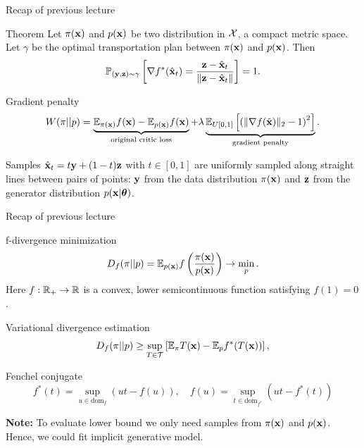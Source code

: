 \begin{frame}{Recap of previous lecture}
	\begin{block}{Theorem}
		Let $\pi(\mathbf{x})$ and $p(\mathbf{x})$ be two distribution in $\mathcal{X}$, a compact metric space. Let $\gamma$ be the optimal transportation plan between $\pi(\mathbf{x})$ and $p(\mathbf{x})$. Then
		\vspace{-0.4cm}
		\[
			\mathbb{P}_{(\mathbf{y}, \mathbf{z}) \sim \gamma} \left[ \nabla f^*(\hat{\mathbf{x}}_t) = \frac{\mathbf{z} - \hat{\mathbf{x}}_t}{\| \mathbf{z} - \hat{\mathbf{x}}_t \|} \right] = 1.
		\]
		\vspace{-0.6cm}
	\end{block}
	\begin{block}{Gradient penalty}
		\vspace{-0.5cm}
		\[
			W(\pi || p) = \underbrace{\mathbb{E}_{\pi(\mathbf{x})} f(\mathbf{x})  - \mathbb{E}_{p(\mathbf{x})} f(\mathbf{x})}_{\text{original critic loss}} + \lambda \underbrace{\mathbb{E}_{U[0, 1]} \left[ \left( \| \nabla f(\hat{\mathbf{x}}) \|_2 - 1 \right) ^ 2\right]}_{\text{gradient penalty}}.
		\]
		\vspace{-0.5cm}
	\end{block}
	Samples $\hat{\mathbf{x}}_t = t \mathbf{y} + (1 - t) \mathbf{z}$ with $t \in [0, 1]$ are uniformly sampled along straight lines between pairs of points: $\mathbf{y}$ from the data distribution $\pi(\mathbf{x})$ and $\mathbf{z}$ from the generator distribution $p(\mathbf{x} | \boldsymbol{\theta})$.
\end{frame}
\begin{frame}{Recap of previous lecture}
	\vspace{-0.3cm}
	\begin{block}{f-divergence minimization}
		\vspace{-0.3cm}
		\[
			D_f(\pi || p) = \mathbb{E}_{p(\mathbf{x})}  f\left( \frac{\pi(\mathbf{x})}{p(\mathbf{x})} \right) \rightarrow \min_p.
		\]
		Here $f: \mathbb{R}_+ \rightarrow \mathbb{R}$ is a convex, lower semicontinuous function satisfying $f(1) = 0$.
	\end{block}
	\begin{block}{Variational divergence estimation}
		\vspace{-0.3cm}
		\[
			D_f(\pi || p) \geq \sup_{T \in \mathcal{T}} \left[\mathbb{E}_{\pi}T(\mathbf{x}) -  \mathbb{E}_p f^*(T(\mathbf{x})) \right],
		\]
		\vspace{-0.7cm}
	\end{block}
	\begin{block}{Fenchel conjugate}
		\vspace{-0.7cm}
		\[
		f^*(t) = \sup_{u \in \text{dom}_f} \left( ut - f(u) \right), \quad f(u) = \sup_{t \in \text{dom}_{f^*}} \left( ut - f^*(t) \right)
		\]
		\vspace{-0.5cm}
	\end{block}
	\textbf{Note:} To evaluate lower bound we only need samples from $\pi(\mathbf{x})$ and $p(\mathbf{x})$. Hence, we could fit implicit generative model.
\end{frame}
